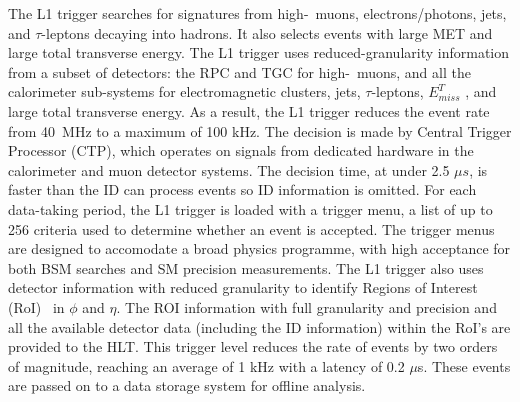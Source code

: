 The L1 trigger searches for signatures from high-\pt\ muons, electrons/photons, jets, and 
\mbox{$\tau$-leptons} decaying into hadrons. It also selects events with large MET
and large total transverse energy. The L1 trigger uses reduced-granularity information from a
subset of detectors: the RPC and TGC for high-\pt\ muons, and all the calorimeter 
sub-systems for electromagnetic clusters, jets, $\tau$-leptons, $E_{miss}^T$ ,
and large total transverse energy.
As a result, the L1 trigger reduces the event rate from 40~MHz to a maximum of 100 kHz.
The decision is made by Central Trigger	Processor (CTP), 
which operates on signals from dedicated hardware in the calorimeter
and muon detector systems. The decision time, at under 2.5 $\mu s$, is faster than the ID
can process events so ID information is omitted.
For each data-taking period, the L1	trigger is loaded with a trigger menu, 
a list of up to 256 criteria used to determine
whether an event is accepted. The trigger menus are designed to accomodate a broad
physics programme, with high acceptance for both BSM searches and SM precision
measurements.
The L1 trigger also uses detector information with reduced granularity to identify Regions
of Interest (RoI)~\cite{Blair:2007qn} in $\phi$ and $\eta$.
The ROI information with full granularity and precision and all the available detector 
data (including the ID information) within the RoI's are provided to the HLT. 
This trigger level reduces the rate of events by two orders of magnitude,
reaching an average of 1 kHz with a latency of 0.2 $\mu$s.
These events are passed on to a data storage system for offline analysis.

